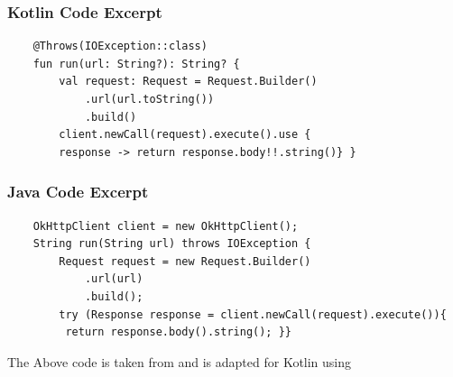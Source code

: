 \subsubsection{Kotlin Code Excerpt}
\begin{verbatim}
    @Throws(IOException::class)
    fun run(url: String?): String? {
        val request: Request = Request.Builder()
            .url(url.toString())
            .build()
        client.newCall(request).execute().use {
        response -> return response.body!!.string()} }
\end{verbatim}
\subsubsection{Java Code Excerpt}
\begin{verbatim}
    OkHttpClient client = new OkHttpClient();
    String run(String url) throws IOException {
        Request request = new Request.Builder()
            .url(url)
            .build();
        try (Response response = client.newCall(request).execute()){
         return response.body().string(); }}
\end{verbatim}
The Above code is taken from \cite{ref1} and is adapted for Kotlin using \cite{ref20}
